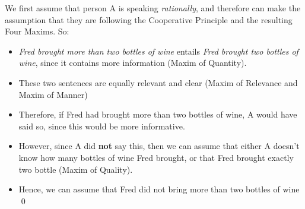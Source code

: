 \documentclass[11pt]{article}
\begin{document}
\begin{solution}
We first assume that person A is speaking \textit{rationally}, and therefore can make the assumption that they are following the Cooperative Principle and the resulting Four Maxims. So:

\begin{itemize}
    \item \textit{Fred brought more than two bottles of wine} entails \textit{Fred brought two bottles of wine}, since it contains more information (Maxim of Quantity).

    \item These two sentences are equally relevant and clear (Maxim of Relevance and Maxim of Manner)

    \item Therefore, if Fred had brought more than two bottles of wine, A would have said so, since this would be more informative.

    \item However, since A did \textbf{not} say this, then we can assume that either A doesn't know how many bottles of wine Fred brought, or that Fred brought exactly two bottle (Maxim of Quality).

    \item Hence, we can assume that Fred did not bring more than two bottles of wine \qed

\end{itemize}

\end{solution}

\vspace*{0.5cm}
\end{document}
